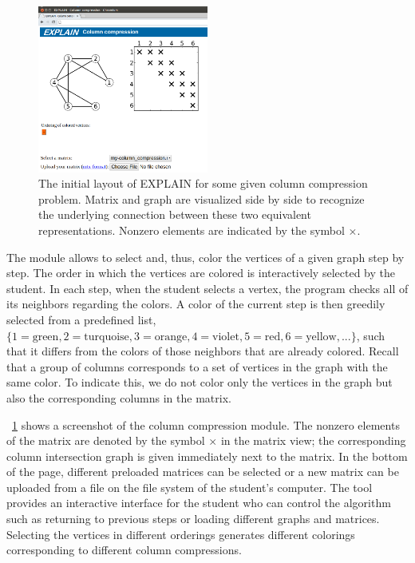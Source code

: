 \documentclass[11pt, twoside,a4paper]{book}
\begin{document}
\begin{figure}
\centering
\includegraphics[width=0.5\textwidth]{fig1.png}
\caption{The initial layout of EXPLAIN for some given column compression problem. Matrix and graph are visualized side by side to recognize the underlying connection between these two equivalent representations. Nonzero elements are indicated by the symbol $\times$.}
\label{fig1}
\end{figure}
The module allows to select and, thus, color the vertices of a given graph step by step. The order in which the vertices are colored is interactively selected by the student. In each step, when the student selects a vertex, the program checks all of its neighbors regarding the colors. A color of the current step is then greedily selected from a predefined list, $\{1=\text{green}, 2=\text{turquoise}, 3=\text{orange}, 4=\text{violet}, 5=\text{red}, 6=\text{yellow}, ...\}$, such that it differs from the colors of those neighbors that are already colored. Recall that a group of columns corresponds to a set of vertices in the graph with the same color. To indicate this, we do not color only the vertices in the graph but also the corresponding columns in the matrix.

\figurename~\ref{fig1} shows a screenshot of the column compression module. The nonzero elements of the matrix are denoted by the symbol $\times$ in the matrix view; the corresponding column intersection graph is given immediately next to the matrix. In the bottom of the page, different preloaded matrices can be selected or a new matrix can be uploaded from a file on the file system of the student's computer. The tool provides an interactive interface for the student who can control the algorithm such as returning to previous steps or loading different graphs and matrices. Selecting the vertices in different orderings generates different colorings corresponding to different column compressions.
\end{document}

